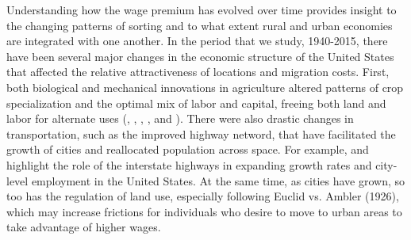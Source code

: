 \documentclass[12pt,twoside]{article}
\begin{document}
Understanding how the wage premium has evolved over time provides insight to the changing patterns of sorting and to what extent rural and urban economies are integrated with one another.  
In the period that we study, 1940-2015, there have been several major changes in the economic structure of the United States that affected the relative attractiveness of locations and migration costs. 
First, both biological and mechanical innovations in agriculture altered patterns of crop specialization and the optimal mix of labor and capital, freeing both land and labor for alternate uses (\citet{caselli2001us}, \citet{michaels2012urbanization}, \citet{olmstead2001reshaping}, \citet{griliches1963sources}, and \citet{jung2020long}). 
There were also drastic changes in transportation, such as the improved highway netword, that have facilitated the growth of cities and reallocated population across space.
For example, \citet{rephann1994new} and \citet{duranton2012urban} highlight the role of the interstate highways in expanding growth rates and city-level employment in the United States. 
At the same time, as cities have grown, so too has the regulation of land use, especially following Euclid vs. Ambler (1926), which may increase frictions for individuals who desire to move to urban areas to take advantage of higher wages. 










 
\end{document}
